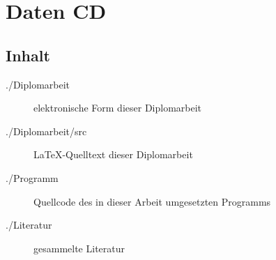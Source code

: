 \chapter{Daten CD}

\section*{Inhalt}


\begin{description}
	\item[./Diplomarbeit] elektronische Form dieser Diplomarbeit
	\item[./Diplomarbeit/src] \LaTeX -Quelltext dieser Diplomarbeit
	\item[./Programm] Quellcode des in dieser Arbeit umgesetzten Programms
	\item[./Literatur] gesammelte Literatur
\end{description}

